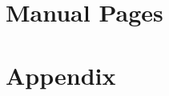 \documentclass[oneside]{book}
\begin{document}





\chapter{Manual Pages}














\chapter{Appendix}




\end{document}
